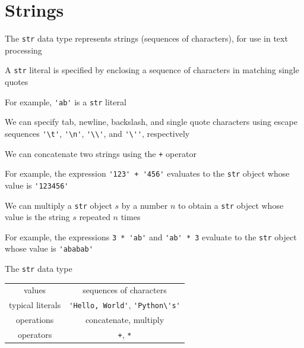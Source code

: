 \documentclass[8pt,a4paper,compress]{beamer}
\begin{document}
\section{Strings}
\begin{frame}[fragile]
\pause

The \lstinline{str} data type represents strings (sequences of characters), for use in text processing

\pause
\bigskip

A \lstinline{str} literal is specified by enclosing a sequence of characters in matching single quotes

\pause
\bigskip

For example, \lstinline{'ab'} is a \lstinline{str} literal

\pause
\bigskip

We can specify tab, newline, backslash, and single quote characters using escape sequences \lstinline{'\t'}, \lstinline{'\n'}, \lstinline{'\\'}, and \lstinline{'\''}, respectively

\pause
\bigskip

We can concatenate two strings using the \lstinline{+} operator

\pause
\bigskip

For example, the expression \lstinline{'123' + '456'} evaluates to the \lstinline{str} object whose value is \lstinline{'123456'}

\pause
\bigskip

We can multiply a \lstinline{str} object $s$ by a number $n$ to obtain a \lstinline{str} object whose value is the string $s$ repeated $n$ times

\pause
\bigskip

For example, the expressions \lstinline{3 * 'ab'} and \lstinline{'ab' * 3} evaluate to the \lstinline{str} object whose value is \lstinline{'ababab'}

\pause
\bigskip

The \lstinline{str} data type

\begin{center}
\begin{tabular}{c|c}
values & sequences of characters \\ 
typical literals & \lstinline$'Hello, World'$, \lstinline$'Python\'s'$ \\ 
operations & concatenate, multiply \\
operators & \lstinline$+$, \lstinline$*$
\end{tabular} 
\end{center}
\end{frame}
\end{document}
